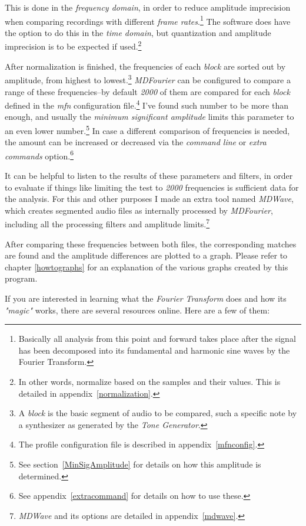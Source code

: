 \documentclass[10pt,a4paper]{report}
\begin{document}
This is done in the \textit{frequency domain}, in order to reduce amplitude imprecision when comparing recordings with different \textit{frame rates}.\footnote{Basically all analysis from this point and forward takes place after the signal has been decomposed into its fundamental and harmonic sine waves by the Fourier Transform.} The software does have the option to do this in the \textit{time domain}, but quantization and amplitude imprecision is to be expected if used.\footnote{In other words, normalize based on the samples and their values. This is detailed in appendix~\ref{normalization}.}

After normalization is finished, the frequencies of each \textit{block} are sorted out by amplitude, from highest to lowest.\footnote{A \textit{block} is the basic segment of audio to be compared, such a specific note by a synthesizer as generated by the \textit{Tone Generator}.} \textit{MDFourier} can be configured to compare a range of these frequencies--by default \textit{2000} of them are compared for each \textit{block} defined in the \textit{mfn} configuration file.\footnote{The profile configuration file is described in appendix~\ref{mfnconfig}.} I've found such number to be more than enough, and usually the \textit{minimum significant amplitude} limits this parameter to an even lower number.\footnote{See section~\ref{MinSigAmplitude} for details on how this amplitude is determined.} In case a different comparison of frequencies is needed, the amount can be increased or decreased via the \textit{command line} or \textit{extra commands} option.\footnote{See appendix~\ref{extracommand} for details on how to use these.}

It can be helpful to listen to the results of these parameters and filters, in order to evaluate if things like limiting the test to \textit{2000} frequencies is sufficient data for the analysis. For this and other purposes I made an extra tool named \textit{MDWave}, which creates segmented audio files as internally processed by \textit{MDFourier}, including all the processing filters and amplitude limits.\footnote{\textit{MDWave} and its options are detailed in appendix~\ref{mdwave}.}

After comparing these frequencies between both files, the corresponding matches are found and the amplitude differences are plotted to a graph. Please refer to chapter \ref{howtographs} for an explanation of the various graphs created by this program.

If you are interested in learning what the \textit{Fourier Transform} does and how its \textit{"magic"} works, there are several resources online. Here are a few of them:
\end{document}
